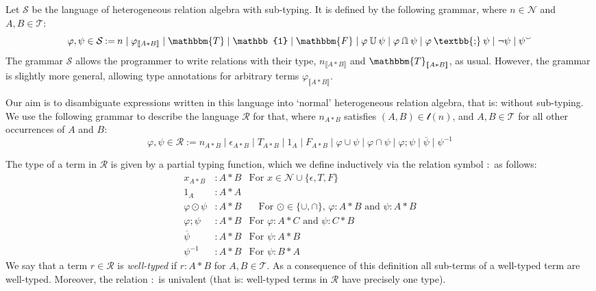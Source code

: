 \documentclass[12pt]{article}
\newcommand{\typesemi}{\mathbin{\text{\textbb{;}}}}
\newcommand{\typeunion}{\mathbin{\mathbb{U}}}
\newcommand{\typeinter}{\mathbin{\text{\rotatebox[origin=c]{180}{$\typeunion$}}}}
\newcommand{\typevee}{\mathbbm{T}}
\newcommand{\typenil}{\mathbbm{F}}
\newcommand{\typecomp}[1]{\neg{#1}}
\newcommand{\typeconv}[1]{{#1}^\smallsmile}
\newcommand{\typeident}{\mathbb{1}}
\newcommand{\typetyped}[2]{{#1}_{\llbracket #2 \rrbracket}}
\newcommand{\conv}[1]{{#1}^{-1}}
\begin{document}
Let $\mathcal{S}$ be the language of heterogeneous relation algebra with sub-typing.
It is defined by the following grammar, where $n\in\mathcal{N}$ and $A,B\in\mathcal{T}$:
\[
\varphi,\psi\in\mathcal{S} \mathbin{:=} n \mid \typetyped{\varphi}{A*B} \mid \typevee \mid \typeident \mid \typenil \mid \varphi \typeunion \psi \mid \varphi \typeinter \psi \mid \varphi \typesemi \psi \mid \typecomp{\psi}\mid \typeconv{\psi}
\]
The grammar $\mathcal{S}$ allows the programmer to write relations with their type, $\typetyped{n}{A*B}$ and $\typetyped{\typevee}{A*B}$, as usual.
However, the grammar is slightly more general, allowing type annotations for arbitrary terms $\typetyped{\varphi}{A*B}$.

Our aim is to disambiguate expressions written in this language into `normal' heterogeneous relation algebra, that is: without sub-typing.
We use the following grammar to describe the language $\mathcal{R}$ for that, where $n_{A*B}$ satisfies $(A,B)\in \mathcal{t}(n)$, and $A,B\in\mathcal{T}%
$ for all other occurrences of $A$ and $B$:
\[
\varphi,\psi\in\mathcal{R} \mathbin{:=} n_{A*B} \mid \epsilon_{A*B} \mid T_{A*B} \mid 1_{A} \mid F_{A*B} \mid \varphi \cup \psi \mid \varphi \cap \psi \mid \varphi ; \psi \mid \overline{\psi}\mid \conv{\psi}
\]

The type of a term in $\mathcal{R}$ is given by a partial typing function, which we define inductively via the relation symbol $:$ as follows:
\begin{align*}
x_{A*B} &: A * B & \text{For $x \in \mathcal{N} \cup \{\epsilon, T, F\}$}\\
1_{A} &: A * A&\\
\varphi \odot \psi &: A * B &\quad\text{For $\odot \in \{\cup,\cap\}$, $\varphi : A * B$ and $\psi : A * B$}\\
\varphi ; \psi &: A * B &\text{For $\varphi : A * C$ and $\psi : C * B$}\\
\overline{\psi} &: A * B &\text{For $\psi : A * B$}\\
\conv{\psi} &: A * B &\text{For $\psi : B * A$}
\end{align*}
We say that a term $r\in \mathcal{R}$ is \emph{well-typed} if $r : A*B$ for $A,B\in \mathcal{T}$.
As a consequence of this definition all sub-terms of a well-typed term are well-typed.
Moreover, the relation $:$ is univalent (that is: well-typed terms in $\mathcal{R}$ have precisely one type).%
\end{document}

